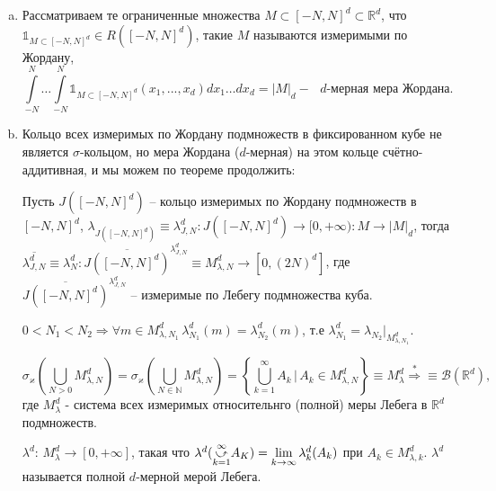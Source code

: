 \documentclass[a4paper, 12pt]{article}
\begin{document}
\begin{enumerate}[a)]
    \item  
    \begin{definition}
        Рассматриваем те ограниченные множества $M \subset [-N, N]^d \subset \mathbb{R}^d$, что $\mathds{1}_{M \subset [-N, N]^d} \in R \left([-N, N]^d \right)$, такие $M$ называются измеримыми по Жордану, 
        $$ \int \limits_{-N}^{N} \dots \int \limits_{-N}^{N} \mathds{1}_{M \subset [-N, N]^d} (x_1, ..., x_d) dx_1 \dots dx_d = |M|_d - \text{ $d$-мерная мера Жордана.}$$
    \end{definition}
    \item Кольцо всех измеримых по Жордану подмножеств в фиксированном кубе не является $\sigma$-кольцом, но мера Жордана ($d$-мерная) на этом кольце счётно-аддитивная, и мы можем по теореме продолжить:
    
    Пусть $J([-N, N]^d)$ -- кольцо измеримых по Жордану подмножеств в $[-N, N]^d$, $\lambda_{J([-N, N]^d)} \equiv \lambda_{J, N}^d: J([-N, N]^d) \rightarrow [0, +\infty): M \rightarrow |M|_d$, тогда $\overline{\lambda_{J, N}^d} \equiv \lambda^d_N : \overline{J([-N, N]^d)}^{\lambda_{J, N}^{d}} \equiv M_{\lambda, N}^d \rightarrow [0, (2N)^d]$, где $\overline{J([-N, N]^d)}^{\lambda_{J, N}^{d}}$ -- измеримые по Лебегу подмножества куба.

    \begin{remark}
        $0 < N_1 < N_2 \Rightarrow \forall m \in M_{\lambda, N_1}^d \, \lambda_{N_1}^d(m) = \lambda_{N_2}^d(m)$, т.е $\lambda_{N_1}^d = \lambda_{N_2} \big|_{M_{\lambda, N_1}^d}$.
    \end{remark}

    \begin{problem}
        $$\sigma_{\varkappa} \left(\bigcup \limits_{N > 0} M_{\lambda, N}^d \right) = \sigma_{\varkappa} \left(\bigcup \limits_{N \in \mathbb{N}} M_{\lambda, N}^d \right) = \left\{ \bigcup \limits_{k = 1}^{\infty} A_k \,\big|\, A_k \in M_{\lambda, N}^d \right\} \equiv M_{\lambda}^d \overset{*}{\Rightarrow} \equiv \mathscr{B}(\mathbb{R}^d),$$
        где $M_{\lambda}^d$ - система всех измеримых относительнго (полной) меры Лебега в $\mathbb{R}^d$ подмножеств.
    \end{problem}

    \begin{definition}
        $\lambda^d: \, M_{\lambda}^d \rightarrow [0, +\infty]$, такая что $\lambda^d(\cuparr{k = 1}{\infty} A_K) = \lim \limits_{k \rightarrow \infty} \lambda_{k}^d(A_k)$ при $A_k \in M_{\lambda, k}^d$.
        $\lambda ^ d$ называется полной $d$-мерной мерой Лебега.
    \end{definition}


\end{enumerate}
\end{document}
